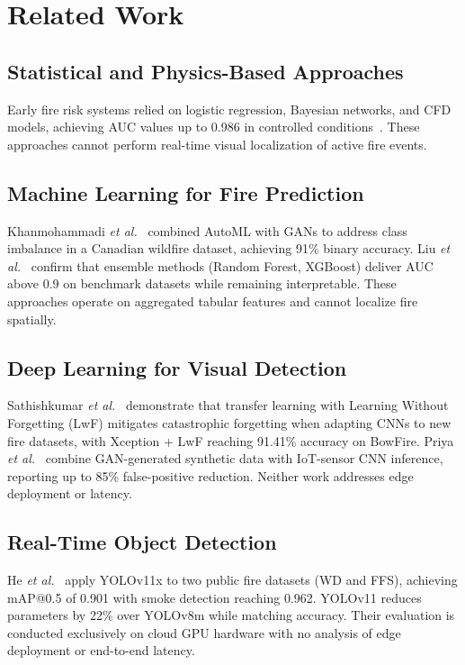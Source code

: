 \documentclass[conference]{IEEEtran}
\begin{document}
\section{Related Work}
\label{sec:related}

\subsection{Statistical and Physics-Based Approaches}
Early fire risk systems relied on logistic regression, Bayesian networks,
and CFD models, achieving AUC values up to 0.986 in controlled
conditions~\cite{liu2025advancements}. These approaches cannot perform
real-time visual localization of active fire events.

\subsection{Machine Learning for Fire Prediction}
Khanmohammadi \textit{et al.}~\cite{khanmohammadi2024automl} combined
AutoML with GANs to address class imbalance in a Canadian wildfire
dataset, achieving 91\% binary accuracy. Liu \textit{et
al.}~\cite{liu2025advancements} confirm that ensemble methods
(Random Forest, XGBoost) deliver AUC above 0.9 on benchmark datasets
while remaining interpretable. These approaches operate on aggregated
tabular features and cannot localize fire spatially.

\subsection{Deep Learning for Visual Detection}
Sathishkumar \textit{et al.}~\cite{sathishkumar2023forest} demonstrate
that transfer learning with Learning Without Forgetting (LwF) mitigates
catastrophic forgetting when adapting CNNs to new fire datasets, with
Xception + LwF reaching 91.41\% accuracy on BowFire. Priya \textit{et
al.}~\cite{priya2025generative} combine GAN-generated synthetic data
with IoT-sensor CNN inference, reporting up to 85\% false-positive
reduction. Neither work addresses edge deployment or latency.

\subsection{Real-Time Object Detection}
He \textit{et al.}~\cite{he2025yolov11} apply YOLOv11x to two public
fire datasets (WD and FFS), achieving mAP@0.5 of 0.901 with smoke
detection reaching 0.962. YOLOv11 reduces parameters by 22\% over
YOLOv8m while matching accuracy. Their evaluation is conducted
exclusively on cloud GPU hardware with no analysis of edge deployment
or end-to-end latency.
\end{document}
